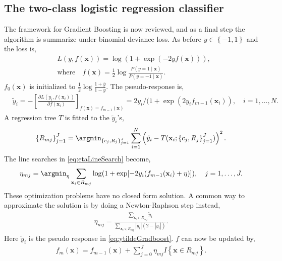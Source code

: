 \subsection{The two-class logistic regression classifier}
\label{sub:The two-class logistic regression classifier}
The framework for Gradient Boosting is now reviewed, and as a final step the algorithm is summarize under binomial deviance loss. As before $y \in \left\{ -1, 1 \right\}$ and the loss is,
\begin{align}
  &L(y, f(\mathbf{x})) = \log (1 + \exp (-2 y f(\mathbf{x}))),\\
  &\text{where} \quad f(\mathbf{x}) = \frac{1}{2} \log \frac{ P(y = 1 \mid \mathbf{x})}{ P(y = -1 \mid \mathbf{x})}  .
\end{align}
$f_0(\mathbf{x})$ is initialized to $\frac{1}{2} \log \frac{1+\bar{y}}{1-\bar{y}}$.  The pseudo-response is,
\begin{align}
  \label{eq:ytildeGradboost} 
  &\tilde{y}_i = 
  -\left[ \frac{\partial L(y_i, f(\mathbf{x}_i)) }{\partial f(\mathbf{x}_i)}  \right]_{f(\mathbf{x}) = f_{m-1}(\mathbf{x})}
  = 2 y_i / (1 + \exp \left( 2 y_i f_{m-1}(\mathbf{x}_i) \right), \quad i = 1, \ldots, N.
\end{align}
A regression tree $T$ is fitted to the $\tilde y_i$'s,
\begin{align}
  \left\{ R_{m j} \right\}_{j = 1}^J  = 
  \argmin_{\left\{ c_j, R_{j} \right\}_{j = 1}^J} \sum^{N}_{i=1} \left( \tilde y_i - T(\mathbf{x}_i; \left\{ c_j, R_j \right\}_{j = 1}^J) \right)^2.
\end{align}
The line searches in \eqref{eq:etaLineSearch} become,
\begin{align}
  \eta_{m j} = \argmin_\eta  \sum_{\mathbf{x}_i \in R_{m j}} \log (1 + \exp [-2 y_i (f_{m-1}(\mathbf{x}_i) + \eta) ]), \quad j = 1, \ldots, J.
\end{align}
These optimization problems have no closed form solution. A common way to approximate the solution is by doing a Newton-Raphson step instead,
\begin{align}
  \eta_{m j} =  \frac{\sum_{\mathbf{x}_i \in R_{m j}} \tilde y_i}{\sum_{\mathbf{x}_i \in R_{m j}} |\tilde y_i|(2-|\tilde y_i|)}.
\end{align}
Here  $\tilde y_i$ is the pseudo response in \eqref{eq:ytildeGradboost}. $f$ can now be updated by,
\begin{align}
  \label{eq:gradBoostUpdateF} 
  f_m(\mathbf{x}) = f_{m-1}(\mathbf{x}) +  \sum^{J}_{j=0} \eta_{m j} I\left\{ \mathbf{x} \in R_{m j} \right\}.
\end{align}
